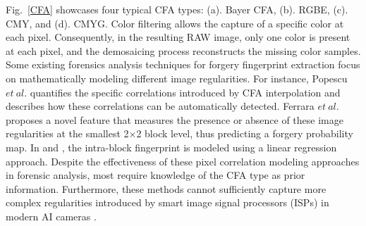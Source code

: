 \documentclass[10pt,journal,compsoc]{IEEEtran}
\begin{document}
Fig.~\ref{CFA} showcases four typical CFA types: (a). Bayer CFA, (b). RGBE, (c). CMY, and (d). CMYG. Color filtering allows the capture of a specific color at each pixel. Consequently, in the resulting RAW image, only one color is present at each pixel, and the demosaicing process reconstructs the missing color samples. Some existing forensics analysis techniques for forgery fingerprint extraction focus on mathematically modeling different image regularities. For instance, Popescu $et~al.$ \cite{popescu2005exposing} quantifies the specific correlations introduced by CFA interpolation and describes how these correlations can be automatically detected. Ferrara $et~al.$ \cite{ferrara2012image} proposes a novel feature that measures the presence or absence of these image regularities at the smallest 2$\times$2 block level, thus predicting a forgery probability map. In \cite{cao2009accurate2} and \cite{li2016color}, the intra-block fingerprint is modeled using a linear regression approach. Despite the effectiveness of these pixel correlation modeling approaches in forensic analysis, most require knowledge of the CFA type as prior information. Furthermore, these methods cannot sufficiently capture more complex regularities introduced by smart image signal processors (ISPs) in modern AI cameras \cite{AIcamera}. 



\end{document}
